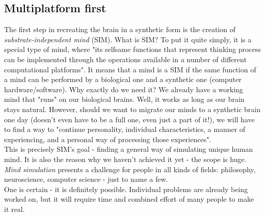 \documentclass[12pt]{article}
\begin{document}
\subsection{Multiplatform first}
	The first step in recreating the brain in a synthetic form is the creation of \emph{substrate-independent mind} (SIM). What is SIM? To put it quite simply, it is a special type of mind, where "its selfsame functions that represent thinking process can be implemented through the operations available in a number of different computational platforms"\cite{sim:1}. It means that a mind is a SIM if the same function of a mind can be performed by a biological one and a synthetic one (computer hardware/software). Why exactly do we need it? We already have a working mind that "runs" on our biological brains. Well, it works as long as our brain stays natural. However, should we want to migrate our minds to a synthetic brain one day (doesn't even have to be a full one, even just a part of it!), we will have to find a way to "continue personality, individual characteristics, a manner of experiencing, and a personal way of processing those experiences"\cite{sim:2}\cite{sim:3}. 
	\\This is precisely SIM's goal - finding a general way of simulating unique human mind. It is also the reason why we haven't achieved it yet - the scope is huge. \emph{Mind simulation} presents a challenge for people in all kinds of fields: philosophy, neuroscience, computer science - just to name a few.
	\\One is certain - it is definitely possible. Individual problems are already being worked on, but it will require time and combined effort of many people to make it real.
\end{document}
